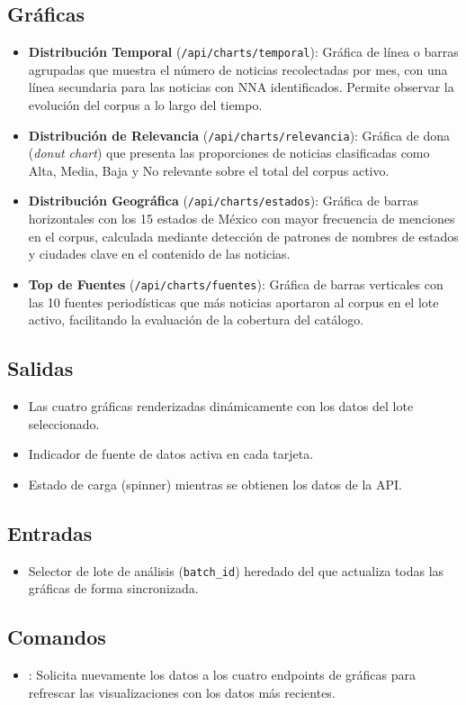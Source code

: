 \subsection{Gráficas}
	\begin{itemize}
		\item \textbf{Distribución Temporal} (\texttt{/api/charts/temporal}): Gráfica de línea o
		      barras agrupadas que muestra el número de noticias recolectadas por mes, con una
		      línea secundaria para las noticias con NNA identificados. Permite observar la
		      evolución del corpus a lo largo del tiempo.

		\item \textbf{Distribución de Relevancia} (\texttt{/api/charts/relevancia}): Gráfica de
		      dona (\textit{donut chart}) que presenta las proporciones de noticias clasificadas
		      como Alta, Media, Baja y No relevante sobre el total del corpus activo.

		\item \textbf{Distribución Geográfica} (\texttt{/api/charts/estados}): Gráfica de barras
		      horizontales con los 15 estados de México con mayor frecuencia de menciones en el
		      corpus, calculada mediante detección de patrones de nombres de estados y ciudades
		      clave en el contenido de las noticias.

		\item \textbf{Top de Fuentes} (\texttt{/api/charts/fuentes}): Gráfica de barras verticales
		      con las 10 fuentes periodísticas que más noticias aportaron al corpus en el lote
		      activo, facilitando la evaluación de la cobertura del catálogo.
	\end{itemize}

\subsection{Salidas}
	\begin{itemize}
		\item Las cuatro gráficas renderizadas dinámicamente con los datos del lote seleccionado.
		\item Indicador de fuente de datos activa en cada tarjeta.
		\item Estado de carga (spinner) mientras se obtienen los datos de la API.
	\end{itemize}

\subsection{Entradas}
	\begin{itemize}
		\item Selector de lote de análisis (\texttt{batch\_id}) heredado del 
		      que actualiza todas las gráficas de forma sincronizada.
	\end{itemize}

\subsection{Comandos}
	\begin{itemize}
		\item {}: Solicita nuevamente los datos a los cuatro endpoints
		      de gráficas para refrescar las visualizaciones con los datos más recientes.
	\end{itemize}
